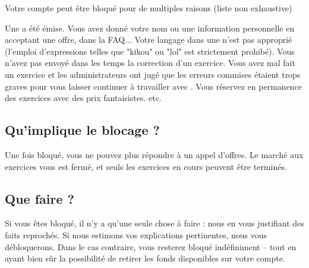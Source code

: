 ﻿Votre compte peut être bloqué pour de multiples raisons (liste non exhaustive)
\begin{itemize}
\li Une  a été émise. Vous avez donné votre nom ou une information personnelle en acceptant une offre, dans la FAQ...
\li Votre langage dans une  n'est pas approprié (l'emploi d'expressions telles que "kikou" ou "lol" est strictement prohibé).
\li Vous n'avez pas envoyé dans les temps la correction d'un exercice.
\li Vous avez mal fait un exercice et les administrateurs ont jugé que les erreurs commises étaient trops graves pour vous laisser continuer à travailler avec \eDevoir.
\li Vous réservez en permanence des exercices avec des prix fantaisistes.
\li etc.
\end{itemize}

\subsection{Qu'implique le blocage ?}
Une fois bloqué, vous ne pouvez plus répondre à un appel d'offres. Le marché aux exercices vous est fermé, et seuls les exercices en cours peuvent être terminés.

\subsection{Que faire ?}
Si vous êtes bloqué, il n'y a qu'une seule chose à faire : nous  en vous justifiant des faits reprochés. Si nous estimons vos explications pertinentes, nous vous débloquerons. Dans le cas contraire, vous resterez bloqué indéfiniment -- tout en ayant bien sûr la possibilité de retirer les fonds disponibles sur votre compte.